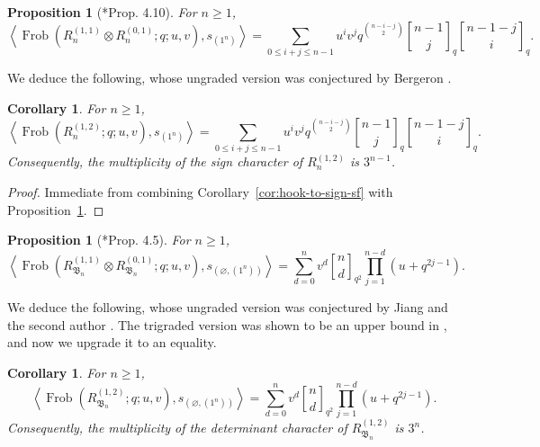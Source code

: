 \documentclass[11pt, reqno]{amsart}
\newtheorem{proposition}[theorem]{Proposition}
\newtheorem{corollary}[theorem]{Corollary}
\theoremstyle{definition}
\theoremstyle{remark}
\numberwithin{equation}{section}
\newcommand{\0}{\emptyset}
\DeclareMathOperator{\Frob}{Frob}
\DeclareRobustCommand{\qbinom}{\genfrac[]{0pt}{}}
\begin{document}
\begin{proposition}[{\cite{BCJLR}*{Prop. 4.10}}]\label{prop:bcjlr-A}
    For $n \geq 1$,
    \begin{equation*}
        \left\langle 
        \Frob \left(R_n^{(1,1)} \otimes R_n^{(0,1)}; q; u, v\right), s_{(1^n)} 
        \right\rangle = 
        \sum_{0 \leq i+j \leq n-1} u^i v^j q^{\binom{n-i-j}{2}} \qbinom{n-1}{j}_q\qbinom{n-1-j}{i}_q.
    \end{equation*}
\end{proposition}

We deduce the following, whose ungraded version was conjectured by Bergeron \cite{Bergeron2020}.

\begin{corollary}\label{cor:12-sign}
For $n \geq 1$,
    \begin{equation*}
        \left\langle 
        \Frob \left(R_n^{(1,2)}; q; u, v\right), s_{(1^n)} \right\rangle = 
        \sum_{0 \leq i+j \leq n-1} u^i v^j q^{\binom{n-i-j}{2}} \qbinom{n-1}{j}_q\qbinom{n-1-j}{i}_q.
    \end{equation*}
Consequently, the multiplicity of the sign character of $R_n^{(1,2)}$ is $3^{n-1}$.
\end{corollary}

\begin{proof}
    Immediate from combining Corollary~\ref{cor:hook-to-sign-sf} with Proposition~\ref{prop:bcjlr-A}.
\end{proof}

\begin{proposition}[{\cite{BCJLR}*{Prop. 4.5}}]\label{prop:bcjlr-B}
    For $n \geq 1$,
    \begin{equation*}
        \left\langle 
        \Frob \left(R_{\mathfrak{B}_n}^{(1,1)} \otimes R_{\mathfrak{B}_n}^{(0,1)}; q; u, v\right), 
        s_{(\varnothing,(1^n))} \right\rangle = 
        \sum_{d=0}^n v^d \qbinom{n}{d}_{q^2} \prod_{j=1}^{n-d} (u+q^{2j-1}). 
    \end{equation*}
\end{proposition}

We deduce the following, whose ungraded version was conjectured by Jiang and the second author \cite{JiangLentfer}.
The trigraded version was shown to be an upper bound in \cite{BCJLR}, and now we upgrade it to an equality.
\begin{corollary}\label{cor:12-sign-B}
For $n \geq 1$,
    \begin{equation*}
        \left\langle 
        \Frob \left(R_{\mathfrak{B}_n}^{(1,2)}; q; u, v\right), 
        s_{(\varnothing,(1^n))} \right\rangle = 
        \sum_{d=0}^n v^d \qbinom{n}{d}_{q^2} \prod_{j=1}^{n-d} (u+q^{2j-1}). 
    \end{equation*}
Consequently, the multiplicity of the determinant character of $R_{\mathfrak{B}_n}^{(1,2)}$ is $3^{n}$.
\end{corollary}
\end{document}
